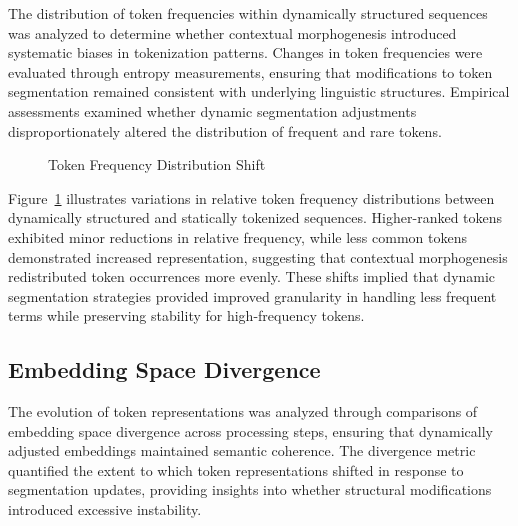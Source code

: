 \documentclass{article}
\begin{document}
The distribution of token frequencies within dynamically structured sequences was analyzed to determine whether contextual morphogenesis introduced systematic biases in tokenization patterns. Changes in token frequencies were evaluated through entropy measurements, ensuring that modifications to token segmentation remained consistent with underlying linguistic structures. Empirical assessments examined whether dynamic segmentation adjustments disproportionately altered the distribution of frequent and rare tokens.

\begin{figure}[t]
	\centering
	\caption{Token Frequency Distribution Shift}
	\label{fig:token_frequency_shift}
\end{figure}

Figure~\ref{fig:token_frequency_shift} illustrates variations in relative token frequency distributions between dynamically structured and statically tokenized sequences. Higher-ranked tokens exhibited minor reductions in relative frequency, while less common tokens demonstrated increased representation, suggesting that contextual morphogenesis redistributed token occurrences more evenly. These shifts implied that dynamic segmentation strategies provided improved granularity in handling less frequent terms while preserving stability for high-frequency tokens.

\subsection{Embedding Space Divergence}

The evolution of token representations was analyzed through comparisons of embedding space divergence across processing steps, ensuring that dynamically adjusted embeddings maintained semantic coherence. The divergence metric quantified the extent to which token representations shifted in response to segmentation updates, providing insights into whether structural modifications introduced excessive instability.
\end{document}
